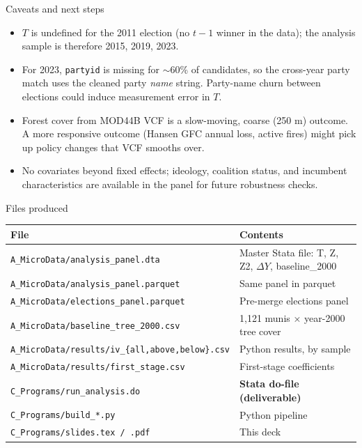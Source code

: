 \documentclass[10pt,aspectratio=169]{beamer}
\begin{document}
\begin{frame}{Caveats and next steps}
\begin{itemize}
  \item $T$ is undefined for the 2011 election (no $t{-}1$ winner in the
        data); the analysis sample is therefore 2015, 2019, 2023.
  \item For 2023, \texttt{partyid} is missing for $\sim$60\% of candidates,
        so the cross-year party match uses the cleaned party \emph{name}
        string. Party-name churn between elections could induce
        measurement error in $T$.
  \item Forest cover from MOD44B VCF is a slow-moving, coarse (250 m)
        outcome. A more responsive outcome (Hansen GFC annual loss,
        active fires) might pick up policy changes that VCF smooths over.
  \item No covariates beyond fixed effects; ideology, coalition status,
        and incumbent characteristics are available in the panel for
        future robustness checks.
\end{itemize}
\end{frame}


\begin{frame}{Files produced}
\footnotesize
\begin{tabular}{ll}
\toprule
File & Contents \\
\midrule
\texttt{A\_MicroData/analysis\_panel.dta} & Master Stata file: T, Z, Z2, $\Delta Y$, baseline\_2000 \\
\texttt{A\_MicroData/analysis\_panel.parquet} & Same panel in parquet \\
\texttt{A\_MicroData/elections\_panel.parquet} & Pre-merge elections panel \\
\texttt{A\_MicroData/baseline\_tree\_2000.csv} & 1{,}121 munis × year-2000 tree cover \\
\texttt{A\_MicroData/results/iv\_\{all,above,below\}.csv} & Python results, by sample \\
\texttt{A\_MicroData/results/first\_stage.csv} & First-stage coefficients \\
\texttt{C\_Programs/run\_analysis.do} & \textbf{Stata do-file (deliverable)} \\
\texttt{C\_Programs/build\_*.py} & Python pipeline \\
\texttt{C\_Programs/slides.tex / .pdf} & This deck \\
\bottomrule
\end{tabular}
\end{frame}
\end{document}

